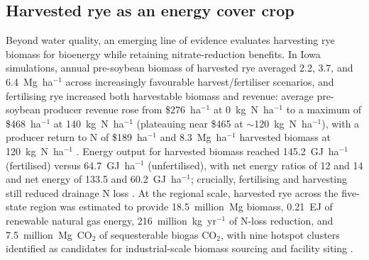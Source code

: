 \subsection{Harvested rye as an energy cover crop}
Beyond water quality, an emerging line of evidence evaluates harvesting rye biomass for bioenergy while retaining nitrate-reduction benefits. In Iowa simulations, annual pre-soybean biomass of harvested rye averaged 2.2, 3.7, and 6.4~Mg~ha$^{-1}$ across increasingly favourable harvest/fertiliser scenarios, and fertilising rye increased both harvestable biomass and revenue: average pre-soybean producer revenue rose from \$276~ha$^{-1}$ at 0~kg~N~ha$^{-1}$ to a maximum of \$468~ha$^{-1}$ at 140~kg~N~ha$^{-1}$ (plateauing near \$465 at $\sim$120~kg~N~ha$^{-1}$), with a producer return to N of \$189~ha$^{-1}$ and 8.3~Mg~ha$^{-1}$ harvested biomass at 120~kg~N~ha$^{-1}$ \parencite{Malone2018}. Energy output for harvested biomass reached 145.2~GJ~ha$^{-1}$ (fertilised) versus 64.7~GJ~ha$^{-1}$ (unfertilised), with net energy ratios of 12 and 14 and net energy of 133.5 and 60.2~GJ~ha$^{-1}$; crucially, fertilising and harvesting still reduced drainage N loss \parencite{Malone2018}. At the regional scale, harvested rye across the five-state region was estimated to provide 18.5~million~Mg biomass, 0.21~EJ of renewable natural gas energy, 216~million~kg~yr$^{-1}$ of N-loss reduction, and 7.5~million~Mg~CO$_2$ of sequesterable biogas CO$_2$, with nine hotspot clusters identified as candidates for industrial-scale biomass sourcing and facility siting \parencite{Malone2023}.

